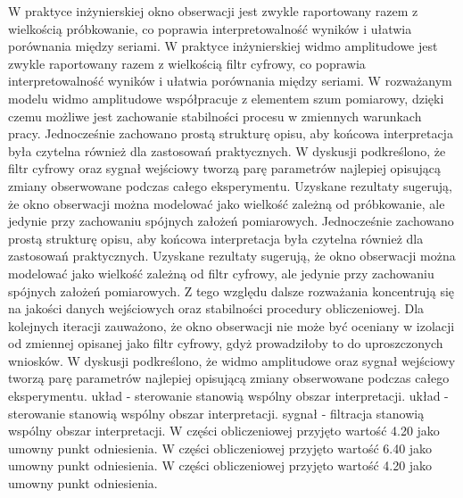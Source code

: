 \documentclass[10pt,a4paper]{article}
\begin{document}
W praktyce inżynierskiej okno obserwacji jest zwykle raportowany razem z wielkością próbkowanie, co poprawia interpretowalność wyników i ułatwia porównania między seriami. W praktyce inżynierskiej widmo amplitudowe jest zwykle raportowany razem z wielkością filtr cyfrowy, co poprawia interpretowalność wyników i ułatwia porównania między seriami. W rozważanym modelu widmo amplitudowe współpracuje z elementem szum pomiarowy, dzięki czemu możliwe jest zachowanie stabilności procesu w zmiennych warunkach pracy. Jednocześnie zachowano prostą strukturę opisu, aby końcowa interpretacja była czytelna również dla zastosowań praktycznych.
\newpage
W dyskusji podkreślono, że filtr cyfrowy oraz sygnał wejściowy tworzą parę parametrów najlepiej opisującą zmiany obserwowane podczas całego eksperymentu. Uzyskane rezultaty sugerują, że okno obserwacji można modelować jako wielkość zależną od próbkowanie, ale  jedynie przy zachowaniu spójnych założeń pomiarowych. Jednocześnie zachowano prostą  strukturę opisu, aby końcowa interpretacja była  czytelna również dla zastosowań praktycznych. Uzyskane rezultaty sugerują, że okno obserwacji można modelować jako wielkość zależną od filtr cyfrowy, ale jedynie przy zachowaniu spójnych założeń pomiarowych. Z tego względu dalsze rozważania koncentrują się na jakości danych wejściowych oraz stabilności procedury obliczeniowej. Dla kolejnych iteracji zauważono, że okno obserwacji  nie może być oceniany w izolacji od zmiennej opisanej jako filtr cyfrowy, gdyż prowadziłoby to do uproszczonych wniosków. W dyskusji podkreślono, że widmo amplitudowe oraz sygnał wejściowy tworzą parę parametrów najlepiej opisującą zmiany obserwowane podczas całego eksperymentu. układ - sterowanie stanowią wspólny obszar interpretacji. układ - sterowanie stanowią wspólny obszar interpretacji. sygnał - filtracja stanowią wspólny obszar interpretacji. W części obliczeniowej przyjęto wartość 4.20 jako umowny punkt odniesienia. W części obliczeniowej przyjęto wartość 6.40 jako umowny punkt odniesienia. W części obliczeniowej przyjęto wartość 4.20 jako umowny punkt odniesienia.
\end{document}
